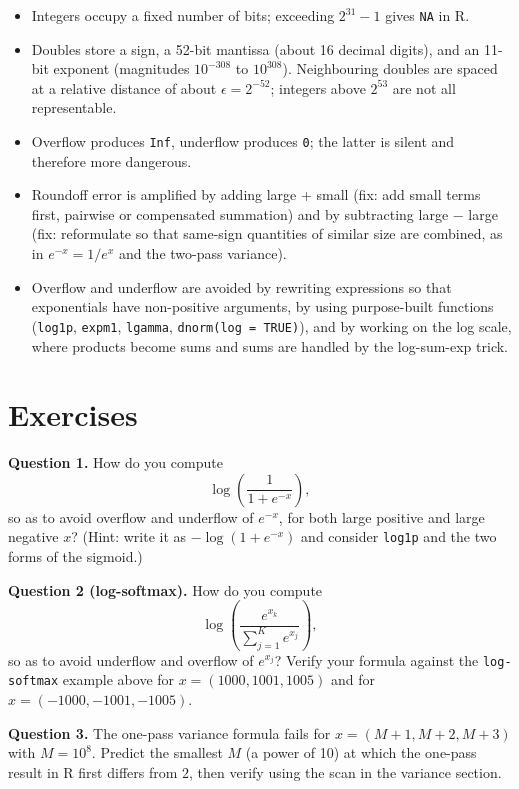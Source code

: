 \documentclass[
  letterpaper,
  DIV=11,
  numbers=noendperiod]{scrreprt}
\begin{document}
\begin{itemize}
\item
  Integers occupy a fixed number of bits; exceeding \(2^{31}-1\) gives
  \texttt{NA} in R.
\item
  Doubles store a sign, a 52-bit mantissa (about 16 decimal digits), and
  an 11-bit exponent (magnitudes \(10^{-308}\) to \(10^{308}\)).
  Neighbouring doubles are spaced at a relative distance of about
  \(\epsilon = 2^{-52}\); integers above \(2^{53}\) are not all
  representable.
\item
  Overflow produces \texttt{Inf}, underflow produces \texttt{0}; the
  latter is silent and therefore more dangerous.
\item
  Roundoff error is amplified by adding large + small (fix: add small
  terms first, pairwise or compensated summation) and by subtracting
  large − large (fix: reformulate so that same-sign quantities of
  similar size are combined, as in \(e^{-x} = 1/e^{x}\) and the two-pass
  variance).
\item
  Overflow and underflow are avoided by rewriting expressions so that
  exponentials have non-positive arguments, by using purpose-built
  functions (\texttt{log1p}, \texttt{expm1}, \texttt{lgamma},
  \texttt{dnorm(log\ =\ TRUE)}), and by working on the log scale, where
  products become sums and sums are handled by the log-sum-exp trick.
\end{itemize}

\section{Exercises}\label{exercises}

\textbf{Question 1.} How do you compute \[
\log\left(\frac{1}{1+e^{-x}}\right),
\] so as to avoid overflow and underflow of \(e^{-x}\), for both large
positive and large negative \(x\)? (Hint: write it as
\(-\log(1+e^{-x})\) and consider \texttt{log1p} and the two forms of the
sigmoid.)

\textbf{Question 2 (log-softmax).} How do you compute \[
\log\left(\frac{e^{x_k}}{\sum_{j=1}^{K} e^{x_j}}\right),
\] so as to avoid underflow and overflow of \(e^{x_j}\)? Verify your
formula against the \texttt{log-softmax} example above for
\(x = (1000, 1001, 1005)\) and for \(x = (-1000, -1001, -1005)\).

\textbf{Question 3.} The one-pass variance formula fails for
\(x = (M+1, M+2, M+3)\) with \(M = 10^{8}\). Predict the smallest \(M\)
(a power of 10) at which the one-pass result in R first differs from
\(2\), then verify using the scan in the variance section.
\end{document}
